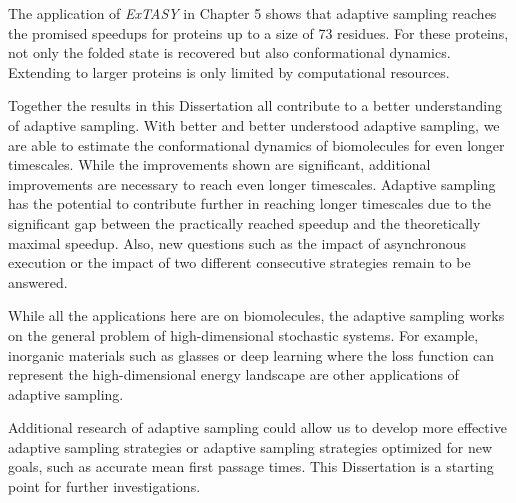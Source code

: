 The application of \emph{ExTASY} in Chapter 5 shows that adaptive sampling reaches the promised speedups for proteins up to a size of 73 residues. For these proteins, not only the folded state is recovered but also conformational dynamics. Extending to larger proteins is only limited by computational resources.

Together the results in this Dissertation all contribute to a better understanding of adaptive sampling. With better and better understood adaptive sampling, we are able to estimate the conformational dynamics of biomolecules for even longer timescales.  While the improvements shown are significant, additional improvements are necessary to reach even longer timescales. Adaptive sampling has the potential to contribute further in reaching longer timescales due to the significant gap between the practically reached speedup and the theoretically maximal speedup. Also, new questions such as the impact of asynchronous execution or the impact of two different consecutive strategies remain to be answered.

While all the applications here are on biomolecules, the adaptive sampling works on the general problem of high-dimensional stochastic systems. For example, inorganic materials such as glasses or deep learning where the loss function can represent the high-dimensional energy landscape are other applications of adaptive sampling.

Additional research of adaptive sampling could allow us to develop more effective adaptive sampling strategies or adaptive sampling strategies optimized for new goals, such as accurate mean first passage times. This Dissertation is a starting point for further investigations.

